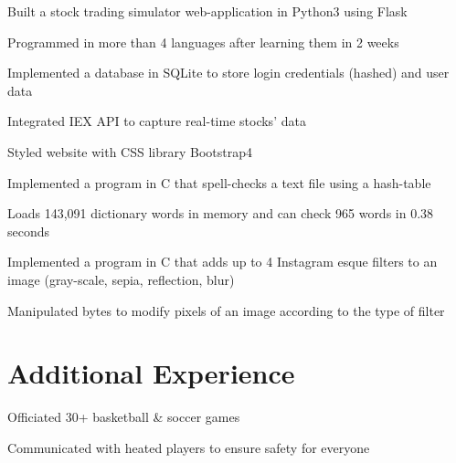 \documentclass[]{deedy-resume-openfont}
\begin{document}
\begin{minipage}[t]{0.66\textwidth}
\begin{tightemize}
\item Built a stock trading simulator web-application in Python3 using Flask
\item Programmed in more than 4 languages after learning them in 2 weeks
\item Implemented a database in SQLite to store login credentials (hashed) and user data
\item Integrated IEX API to capture real-time stocks' data
\item Styled website with CSS library Bootstrap4
\end{tightemize}
\sectionsep

\begin{tightemize}
\item Implemented a program in C that spell-checks a text file using a hash-table
\item Loads 143,091 dictionary words in memory and can check 965 words in 0.38 seconds
\end{tightemize}
\sectionsep

\begin{tightemize}
\item Implemented a program in C that adds up to 4 Instagram esque filters to an image (gray-scale, sepia, reflection, blur)
\item Manipulated bytes to modify pixels of an image according to the type of filter
\end{tightemize}
\sectionsep

\section {Additional Experience}
\begin{tightemize}
\item Officiated 30+ basketball \& soccer games
\item Communicated with heated players to ensure safety for everyone
\end{tightemize}




\end{minipage}
\end{document}
